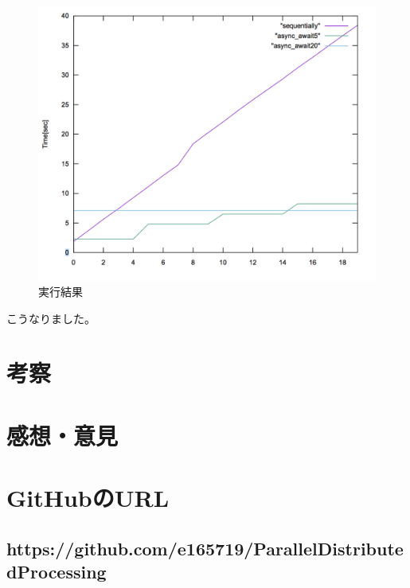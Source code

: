 \documentclass[14pt, oneside]{article}     	%
\begin{document}
\begin{figure}[H]
  \centering
  \includegraphics[width=13cm]{time.png}
  \caption{実行結果}
\end{figure}

こうなりました。


\section{考察}



\section{感想・意見}
\section*{GitHubのURL}

\subsection*{https://github.com/e165719/ParallelDistributedProcessing}
\end{document}
